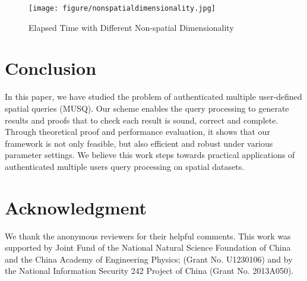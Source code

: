 \documentclass[10pt, conference, compsocconf]{IEEEtran}
\begin{document}
\begin{figure}[htbp]
	\centering
	\texttt{[image: figure/nonspatialdimensionality.jpg]}
	\caption{Elapsed Time with Different Non-spatial Dimensionality }\label{nonspatial}
\end{figure}


\section{Conclusion}\label{conclusion}

In this paper, we have studied the problem of authenticated multiple user-defined spatial queries (MUSQ). Our scheme enables the query processing to generate results and proofs that to check each result is sound, correct and complete. Through theoretical proof and performance evaluation, it shows that our framework is not only feasible, but also efficient and robust under various parameter settings. We believe this work steps towards practical applications of authenticated multiple users query processing on spatial datasets. 


\section{Acknowledgment}

We thank the anonymous reviewers for their helpful comments. This work was supported by Joint Fund of the National Natural Science Foundation of China and the China Academy of Engineering Physics; (Grant No. U1230106) and by the National Information Security 242 Project of China (Grant No. 2013A050).




\end{document}
